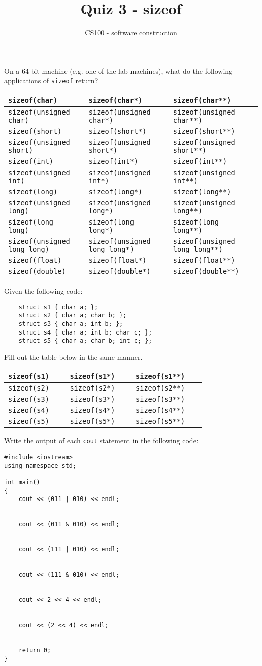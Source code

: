 \documentclass{article}
\title{Quiz 3 - sizeof}
\author{CS100 - software construction}
\newcommand{\sizeof}[1]{\texttt{sizeof({#1})~~~}}
\newcommand{\ptr}[1]{\sizeof{{#1}} & \sizeof{{#1}*} & \sizeof{{#1}**}\vspace{0.45in}\\\hline}
\newcommand{\ptrU}[1]{
    \ptr{{#1}}
    \ptr{unsigned {#1}}
    }
\begin{document}
\maketitle

On a 64 bit machine (e.g. one of the lab machines), what do the following applications of \texttt{sizeof} return?
\vspace{0.15in}

\noindent
\begin{tabular}{p{2.3in}p{2.3in}p{2.3in}}
\hline
\ptrU{char}
\ptrU{short}
\ptrU{int}
\ptrU{long}
\ptrU{long long}
\ptr{float}
\ptr{double}
\end{tabular}

\newpage
Given the following code:
\begin{lstlisting}
    struct s1 { char a; };
    struct s2 { char a; char b; };
    struct s3 { char a; int b; };
    struct s4 { char a; int b; char c; };
    struct s5 { char a; char b; int c; };
\end{lstlisting}
Fill out the table below in the same manner.
\vspace{0.15in}

\noindent
\begin{tabular}{p{2.3in}p{2.3in}p{2.3in}}
\hline
\ptr{s1}
\ptr{s2}
\ptr{s3}
\ptr{s4}
\ptr{s5}
\end{tabular}

\vspace{0.5in}
Write the output of each \lstinline{cout} statement in the following code:

\begin{lstlisting}
#include <iostream>
using namespace std;

int main()
{
    cout << (011 | 010) << endl;


    cout << (011 & 010) << endl;


    cout << (111 | 010) << endl;


    cout << (111 & 010) << endl;


    cout << 2 << 4 << endl;


    cout << (2 << 4) << endl;


    return 0;
}
\end{lstlisting}
\end{document}
